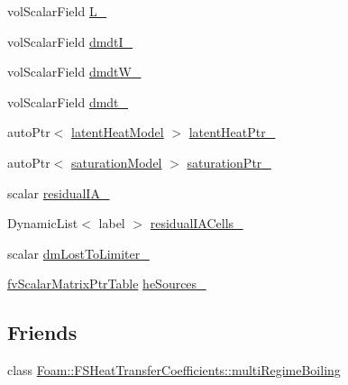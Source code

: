 \begin{DoxyCompactItemize}
\item 
vol\+Scalar\+Field \hyperlink{classFoam_1_1phaseChangeModel_a29caca749e7ec1ad8a2855e041f82e88}{L\+\_\+}
\item 
vol\+Scalar\+Field \hyperlink{classFoam_1_1phaseChangeModel_a0cbe0dc9999d3655f2118fbb615f6163}{dmdt\+I\+\_\+}
\item 
vol\+Scalar\+Field \hyperlink{classFoam_1_1phaseChangeModel_a5eed5a27c67b82e66739d5b0a9b3701b}{dmdt\+W\+\_\+}
\item 
vol\+Scalar\+Field \hyperlink{classFoam_1_1phaseChangeModel_a82c457d870d3464c7bad1bd4e5efdc0b}{dmdt\+\_\+}
\item 
auto\+Ptr$<$ \hyperlink{classFoam_1_1latentHeatModel}{latent\+Heat\+Model} $>$ \hyperlink{classFoam_1_1phaseChangeModel_a0306f24f52a3541db5de1ae50bf87fd0}{latent\+Heat\+Ptr\+\_\+}
\item 
auto\+Ptr$<$ \hyperlink{classFoam_1_1saturationModel}{saturation\+Model} $>$ \hyperlink{classFoam_1_1phaseChangeModel_adb7e5fad34c7f40c5b1a4cb3c3016f97}{saturation\+Ptr\+\_\+}
\item 
scalar \hyperlink{classFoam_1_1phaseChangeModel_a9b3de14f2d6b232e13c9a6acd7cf0fab}{residual\+I\+A\+\_\+}
\item 
Dynamic\+List$<$ label $>$ \hyperlink{classFoam_1_1phaseChangeModel_a66d0d4a237686555d8f7120802e05c07}{residual\+I\+A\+Cells\+\_\+}
\item 
scalar \hyperlink{classFoam_1_1phaseChangeModel_a3c8d8ff7d6c55677a05cca3647a9c214}{dm\+Lost\+To\+Limiter\+\_\+}
\item 
\hyperlink{classFoam_1_1phaseChangeModel_a47dacb23df9a151e6da0902f1726ef21}{fv\+Scalar\+Matrix\+Ptr\+Table} \hyperlink{classFoam_1_1phaseChangeModel_a1fb6dd21f501635afc552fde5a0fc7b3}{he\+Sources\+\_\+}
\end{DoxyCompactItemize}
\subsection*{Friends}
\begin{DoxyCompactItemize}
\item 
class \hyperlink{classFoam_1_1phaseChangeModel_ac7d3409606e3e4844f9613fbc2d943c7}{Foam\+::\+F\+S\+Heat\+Transfer\+Coefficients\+::multi\+Regime\+Boiling}
\end{DoxyCompactItemize}


